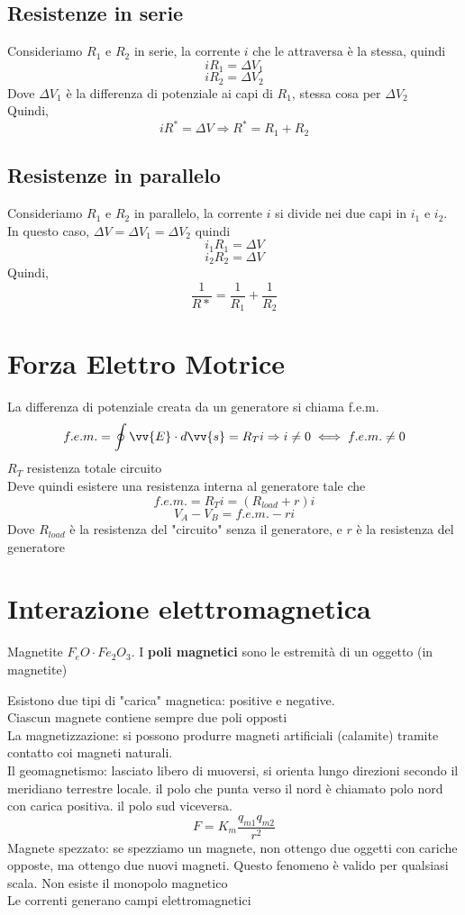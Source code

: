 \documentclass[a4paper]{report}
\begin{document}
  \subsection{Resistenze in serie}
  Consideriamo $R_1$ e $R_2$ in serie, la corrente $i$ che le attraversa è la stessa, quindi
  $$ i R_1 = \Delta V_1 $$
  $$ i R_2 = \Delta V_2 $$
  Dove $\Delta V_1$ è la differenza di potenziale ai capi di $R_1$, stessa cosa per $\Delta V_2$\\
  Quindi,
  $$ i R^* = \Delta V \Rightarrow R^* = R_1 +R_2 $$

  \subsection{Resistenze in parallelo}
  Consideriamo $R_1$ e $R_2$ in parallelo, la corrente $i$ si divide nei due capi in $i_1$ e $i_2$. In questo caso, $\Delta V = \Delta V_1 = \Delta V_2$ quindi
  $$ i_1 R_1 = \Delta V $$
  $$ i_2 R_2 = \Delta V $$
  Quindi,
  $$ \frac{1}{R*} = \frac{1}{R_1} + \frac{1}{R_2} $$

  \section{Forza Elettro Motrice}
  La differenza di potenziale creata da un generatore si chiama f.e.m.
  $$ f.e.m. = \oint \vv{E} \cdot d\vv{s} = R_T i \Rightarrow i \neq 0 \iff f.e.m. \neq 0$$
  $R_T$ resistenza totale circuito\\
  Deve quindi esistere una resistenza interna al generatore tale che
  $$ f.e.m. = R_T i = (R_{load} + r)i $$
  $$ V_A - V_B = f.e.m. -ri $$
  Dove $R_{load}$ è la resistenza del "circuito" senza il generatore, e $r$ è la resistenza del generatore

  \section{Interazione elettromagnetica}
  Magnetite $F_eO \cdot Fe_2O_3$. I \textbf{poli magnetici} sono le estremità di un oggetto (in magnetite)
  
  Esistono due tipi di "carica" magnetica: positive e negative.\\
  Ciascun magnete contiene sempre due poli opposti\\
  La magnetizzazione: si possono produrre magneti artificiali (calamite) tramite contatto coi magneti naturali.\\
  Il geomagnetismo: lasciato libero di muoversi, si orienta lungo direzioni secondo il meridiano terrestre locale. il polo che punta verso il nord è chiamato polo nord con carica positiva. il polo sud viceversa.\\
  $$F = K_m \frac{q_{m1}q_{m2}}{r^2}$$
  Magnete spezzato: se spezziamo un magnete, non ottengo due oggetti con cariche opposte, ma ottengo due nuovi magneti. Questo fenomeno è valido per qualsiasi scala. Non esiste il monopolo magnetico\\
  Le correnti generano campi elettromagnetici
\end{document}
